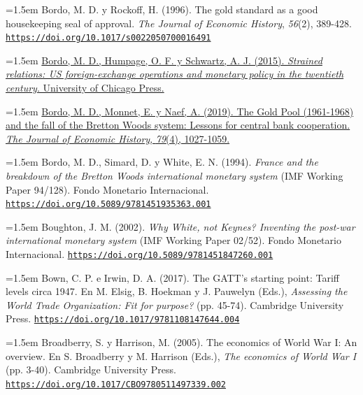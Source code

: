 \documentclass[10pt,a4paper]{article}
\begin{document}
{\sloppy\noindent\hangindent=1.5em Bordo, M. D. y Rockoff, H. (1996). The gold standard as a good housekeeping seal of approval. \textit{The Journal of Economic History}, \textit{56}(2), 389-428. \href{https://doi.org/10.1017/s0022050700016491}{\nolinkurl{https://doi.org/10.1017/s0022050700016491}}\par}

{\sloppy\noindent\hangindent=1.5em \href{https://ideas.repec.org/h/nbr/nberch/13540.html}{Bordo, M. D., Humpage, O. F. y Schwartz, A. J. (2015). \textit{Strained relations: US foreign-exchange operations and monetary policy in the twentieth century}. University of Chicago Press.}\par}

{\sloppy\noindent\hangindent=1.5em \href{https://econpapers.repec.org/RePEc:cup:jechis:v:79:y:2019:i:4:p:1027-1059_4}{Bordo, M. D., Monnet, E. y Naef, A. (2019). The Gold Pool (1961-1968) and the fall of the Bretton Woods system: Lessons for central bank cooperation. \textit{The Journal of Economic History}, \textit{79}(4), 1027-1059.}\par}

{\sloppy\noindent\hangindent=1.5em Bordo, M. D., Simard, D. y White, E. N. (1994). \textit{France and the breakdown of the Bretton Woods international monetary system} (IMF Working Paper 94/128). Fondo Monetario Internacional. \href{https://doi.org/10.5089/9781451935363.001}{\nolinkurl{https://doi.org/10.5089/9781451935363.001}}\par}

{\sloppy\noindent\hangindent=1.5em Boughton, J. M. (2002). \textit{Why White, not Keynes? Inventing the post-war international monetary system} (IMF Working Paper 02/52). Fondo Monetario Internacional. \href{https://doi.org/10.5089/9781451847260.001}{\nolinkurl{https://doi.org/10.5089/9781451847260.001}}\par}

{\sloppy\noindent\hangindent=1.5em Bown, C. P. e Irwin, D. A. (2017). The GATT's starting point: Tariff levels circa 1947. En M. Elsig, B. Hoekman y J. Pauwelyn (Eds.), \textit{Assessing the World Trade Organization: Fit for purpose?} (pp. 45-74). Cambridge University Press. \href{https://doi.org/10.1017/9781108147644.004}{\nolinkurl{https://doi.org/10.1017/9781108147644.004}}\par}

{\sloppy\noindent\hangindent=1.5em Broadberry, S. y Harrison, M. (2005). The economics of World War I: An overview. En S. Broadberry y M. Harrison (Eds.), \textit{The economics of World War I} (pp. 3-40). Cambridge University Press. \href{https://doi.org/10.1017/CBO9780511497339.002}{\nolinkurl{https://doi.org/10.1017/CBO9780511497339.002}}\par}
\end{document}
